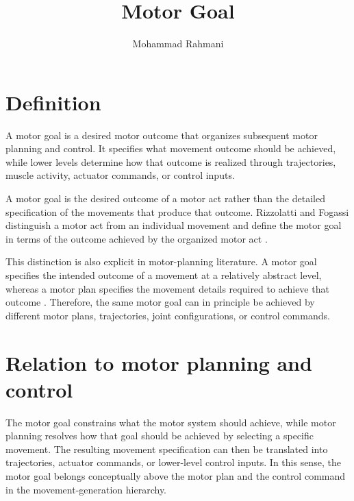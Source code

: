 \documentclass[a4paper]{article}
\title{Motor Goal}
\date{}
\author{Mohammad Rahmani}
\begin{document}
   \maketitle

   \section{Definition}
      A motor goal is a desired motor outcome that organizes subsequent motor planning and control. It specifies what movement outcome should be achieved, while lower levels determine how that outcome is realized through trajectories, muscle activity, actuator commands, or control inputs.


      A motor goal is the desired outcome of a motor act rather than the detailed specification of the movements that produce that outcome. Rizzolatti and Fogassi distinguish a motor act from an individual movement and define the motor goal in terms of the outcome achieved by the organized motor act \cite{rizzolatti-2014-the-mirror-mechanism-recent-findings-and-perspectives}.

      This distinction is also explicit in motor-planning literature. A motor goal specifies the intended outcome of a movement at a relatively abstract level, whereas a motor plan specifies the movement details required to achieve that outcome \cite{wong-2017-motor-planning-flexibly-optimizes-performance-under-uncertainty-about-task-goals}. Therefore, the same motor goal can in principle be achieved by different motor plans, trajectories, joint configurations, or control commands.

   \section{Relation to motor planning and control}
      The motor goal constrains what the motor system should achieve, while motor planning resolves how that goal should be achieved by selecting a specific movement. The resulting movement specification can then be translated into trajectories, actuator commands, or lower-level control inputs. In this sense, the motor goal belongs conceptually above the motor plan and the control command in the movement-generation hierarchy.



      
      
\end{document}
